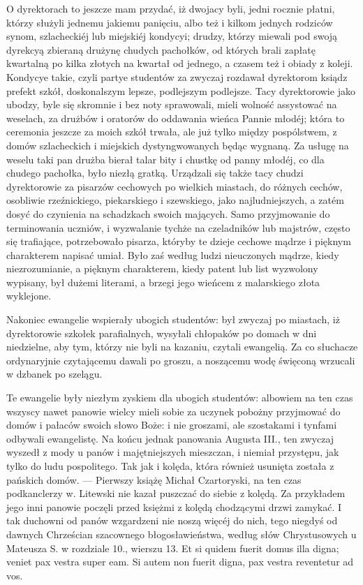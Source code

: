 \documentclass{book}
\begin{document}
O dyrektorach to jeszcze mam przydać, iż dwojacy byli, jedni rocznie płatni, którzy służyli jednemu jakiemu panięciu, albo też i kilkom jednych rodziców synom, szlacheckiéj lub miejskiéj kondycyi; drudzy, którzy miewali pod swoją dyrekcyą zbieraną drużynę chudych pachołków, od których brali zapłatę kwartalną po kilka złotych na kwartał od jednego, a czasem też i obiady z koleji. Kondycye takie, czyli partye studentów za zwyczaj rozdawał dyrektorom ksiądz prefekt szkół, doskonalszym lepsze, podlejszym podlejsze. Tacy dyrektorowie jako ubodzy, byle się skromnie i bez noty sprawowali, mieli wolność assystować na weselach, za drużbów i oratorów do oddawania wieńca Pannie młodéj; która to ceremonia jeszcze za moich szkół trwała, ale już tylko między pospólstwem, z domów szlacheckich i miejskich dystyngwowanych będąc wygnaną. Za usługę na weselu taki pan drużba bierał talar bity i chustkę od panny młodéj, co dla chudego pachołka, było niezłą gratką. Urządzali się także tacy chudzi dyrektorowie za pisarzów cechowych po wielkich miastach, do różnych cechów, osobliwie rzeźnickiego, piekarskiego i szewskiego, jako najludniejszych, a zatém dosyć do czynienia na schadzkach swoich mających. Samo przyjmowanie do terminowania uczniów, i wyzwalanie tychże na czeladników lub majstrów, często się trafiające, potrzebowało pisarza, któryby te dzieje cechowe mądrze i pięknym charakterem napisać umiał. Było zaś według ludzi nieuczonych mądrze, kiedy niezrozumianie, a pięknym charakterem, kiedy patent lub list wyzwolony wypisany, był dużemi literami, a brzegi jego wieńcem z malarskiego złota wyklejone.

Nakoniec ewangelie wspierały ubogich studentów: był zwyczaj po miastach, iż dyrektorowie szkołek parafialnych, wysyłali chłopaków po domach w dni niedzielne, aby tym, którzy nie byli na kazaniu, czytali ewangelią. Za co słuchacze ordynaryjnie czytającemu dawali po groszu, a noszącemu wodę święconą wrzucali w dzbanek po szelągu.

Te ewangelie były niezłym zyskiem dla ubogich studentów: albowiem na ten czas wszyscy nawet panowie wielcy mieli sobie za uczynek pobożny przyjmować do domów i pałaców swoich słowo Boże: i nie groszami, ale szostakami i tynfami odbywali ewangelistę. Na końcu jednak panowania Augusta III., ten zwyczaj wyszedł z mody u panów i majętniejszych mieszczan, i niemiał przystępu, jak tylko do ludu pospolitego. Tak jak i kolęda, która również usunięta została z pańskich domów. — Pierwszy książę Michał Czartoryski, na ten czas podkanclerzy w. Litewski nie kazał puszczać do siebie z kolędą. Za przykładem jego inni panowie poczęli przed księżmi z kolędą chodzącymi drzwi zamykać. I tak duchowni od panów wzgardzeni nie noszą więcéj do nich, tego niegdyś od dawnych Chrześcian szacownego błogosławieństwa, według słów Chrystusowych u Mateusza S. w rozdziale 10., wierszu 13. Et si quidem fuerit domus illa digna; veniet pax vestra super eam. Si autem non fuerit digna, pax vestra reventetur ad vos.
\end{document}
